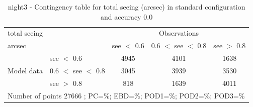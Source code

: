 \begin{table}[p!]
\begin{center}
\begin{tabular}{llccc}
\hline
{total seeing}                                       &                                                    & \multicolumn{3}{c}{Observations}                 \\
{arcsec}                                       &                             & see $<$ 0.6   & 0.6 $<$ see $<$ 0.8 & see $>$ 0.8 \\
\hline
\multicolumn{1}{c}{\multirow{3}{*}{Model data}}  & see $<$ 0.6             & 4945                & 4101                       & 1638              \\
                                                 & 0.6  $<$ see $<$ 0.8 & 3045                & 3939                       & 3530              \\
                                                 & see $>$ 0.8             & 818                & 1639                       & 4011              \\
\hline
\multicolumn{5}{l}{ Number of points        27666 ; PC=\%; EBD=\%; POD1=\%; POD2=\%; POD3=\%}
\end{tabular}
\end{center}
\caption{night3 - Contingency table for  total seeing (arcsec) in standard configuration and accuracy 0.0}
\label{tab:contingencyseeBEF:night3}
\end{table}
